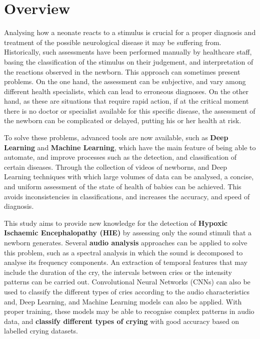 \newpage
\section*{Overview}
\label{sec::resumen}

Analysing how a neonate reacts to a stimulus is crucial for a proper diagnosis and treatment of the possible neurological disease it may be suffering from. Historically, such assessments have been performed manually by healthcare staff, basing the classification of the stimulus on their judgement, and interpretation of the reactions observed in the newborn. This approach can sometimes present problems. On the one hand, the assessment can be subjective, and vary among different health specialists, which can lead to erroneous diagnoses. On the other hand, as these are situations that require rapid action, if at the critical moment there is no doctor or specialist available for this specific disease, the assessment of the newborn can be complicated or delayed, putting his or her health at risk. 

To solve these problems, advanced tools are now available, such as \textbf{Deep Learning} and \textbf{Machine Learning}, which have the main feature of being able to automate, and improve processes such as the detection, and classification of certain diseases. Through the collection of videos of newborns, and Deep Learning techniques with which large volumes of data can be analysed, a concise, and uniform assessment of the state of health of babies can be achieved. This avoids inconsistencies in classifications, and increases the accuracy, and speed of diagnosis.

This study aims to provide new knowledge for the detection of \textbf{Hypoxic Ischaemic Encephalopathy (HIE)} by assessing only the sound stimuli that a newborn generates. Several \textbf{audio analysis} approaches can be applied to solve this problem, such as a spectral analysis in which the sound is decomposed to analyse its frequency components. An extraction of temporal features that may include the duration of the cry, the intervals between cries or the intensity patterns can be carried out. Convolutional Neural Networks (CNNs) can also be used to classify the different types of cries according to the audio characteristics and, Deep Learning, and Machine Learning models can also be applied. With proper training, these models may be able to recognise complex patterns in audio data, and \textbf{classify different types of crying} with good accuracy based on labelled crying datasets.

